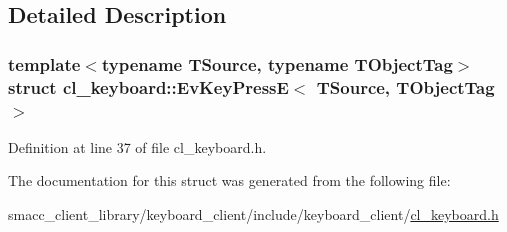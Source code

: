 \subsection{Detailed Description}
\subsubsection*{template$<$typename T\+Source, typename T\+Object\+Tag$>$\newline
struct cl\+\_\+keyboard\+::\+Ev\+Key\+Press\+E$<$ T\+Source, T\+Object\+Tag $>$}



Definition at line 37 of file cl\+\_\+keyboard.\+h.



The documentation for this struct was generated from the following file\+:\begin{DoxyCompactItemize}
\item 
smacc\+\_\+client\+\_\+library/keyboard\+\_\+client/include/keyboard\+\_\+client/\hyperlink{cl__keyboard_8h}{cl\+\_\+keyboard.\+h}\end{DoxyCompactItemize}
